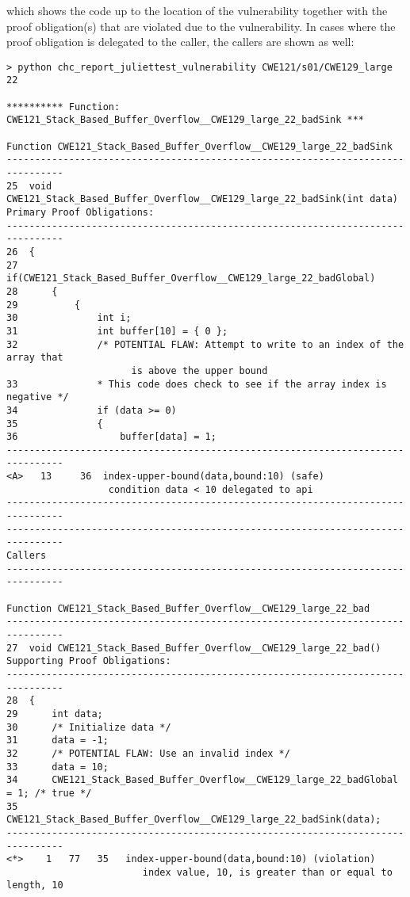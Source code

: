\documentclass[11pt]{article}
\begin{document}
which shows the code up to the location of the vulnerability together with the
proof obligation(s) that are violated due to the vulnerability. In cases where
the proof obligation is delegated to the caller, the callers are shown as well:
\begin{scriptsize}
\begin{verbatim}
> python chc_report_juliettest_vulnerability CWE121/s01/CWE129_large 22

********** Function: CWE121_Stack_Based_Buffer_Overflow__CWE129_large_22_badSink ***

Function CWE121_Stack_Based_Buffer_Overflow__CWE129_large_22_badSink
--------------------------------------------------------------------------------
25  void CWE121_Stack_Based_Buffer_Overflow__CWE129_large_22_badSink(int data)
Primary Proof Obligations:
--------------------------------------------------------------------------------
26  {
27      if(CWE121_Stack_Based_Buffer_Overflow__CWE129_large_22_badGlobal)
28      {
29          {
30              int i;
31              int buffer[10] = { 0 };
32              /* POTENTIAL FLAW: Attempt to write to an index of the array that 
                      is above the upper bound
33              * This code does check to see if the array index is negative */
34              if (data >= 0)
35              {
36                  buffer[data] = 1;
--------------------------------------------------------------------------------
<A>   13     36  index-upper-bound(data,bound:10) (safe)
                  condition data < 10 delegated to api
--------------------------------------------------------------------------------
--------------------------------------------------------------------------------
Callers
--------------------------------------------------------------------------------

Function CWE121_Stack_Based_Buffer_Overflow__CWE129_large_22_bad
--------------------------------------------------------------------------------
27  void CWE121_Stack_Based_Buffer_Overflow__CWE129_large_22_bad()
Supporting Proof Obligations:
--------------------------------------------------------------------------------
28  {
29      int data;
30      /* Initialize data */
31      data = -1;
32      /* POTENTIAL FLAW: Use an invalid index */
33      data = 10;
34      CWE121_Stack_Based_Buffer_Overflow__CWE129_large_22_badGlobal = 1; /* true */
35      CWE121_Stack_Based_Buffer_Overflow__CWE129_large_22_badSink(data);
--------------------------------------------------------------------------------
<*>    1   77   35   index-upper-bound(data,bound:10) (violation)
                        index value, 10, is greater than or equal to length, 10



\end{verbatim}
\end{scriptsize}
\end{document}
